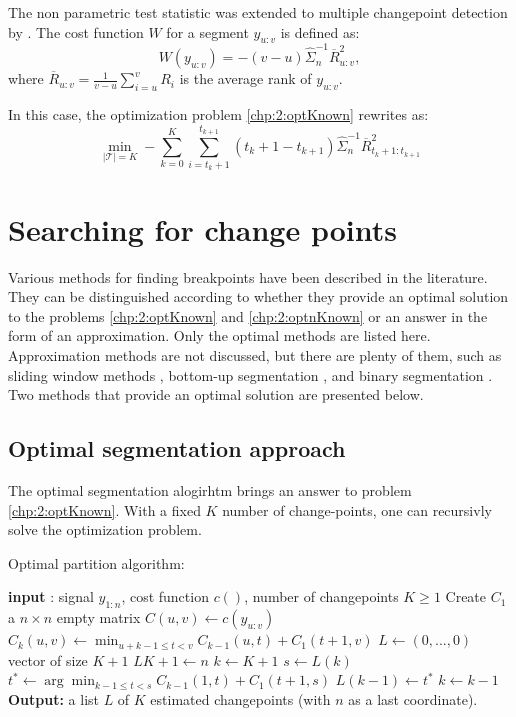 The non parametric test statistic was extended to multiple changepoint detection by \cite{lung2015}. The cost function $W$ for a segment $y_{u:v}$ is defined as: 
\begin{equation}
  W(y_{u:v}) = -(v-u)\hat{\Sigma}^{-1}_n\overline{R}^2_{u:v},
\end{equation}
where $\overline{R}_{u:v} = \frac{1}{v-u}\sum_{i = u}^vR_i$ is the average rank of $y_{u:v}$.

In this case, the optimization problem \ref{chp:2:optKnown} rewrites as: 
\begin{equation}\label{chp:2:npcost}
\min_{\lvert\mathcal{T}\rvert = K}  -\sum_{k=0}^K \sum_{i = t_k+1}^{t_{k+1}} (t_k+1-t_{k+1})\hat{\Sigma}^{-1}_n\overline{R}^2_{t_k+1:t_{k+1}}
\end{equation}       

\section{Searching for change points}

Various methods for finding breakpoints have been described in the literature. They can be distinguished according to whether they provide an optimal solution to the problems \ref{chp:2:optKnown} and \ref{chp:2:optnKnown} or an answer in the form of an approximation. Only the optimal methods are listed here. Approximation methods are not discussed, but there are plenty of them, such as sliding window methods \cite{Li2010,Liu2022}, bottom-up segmentation \cite{chen1998speaker}, and binary segmentation \cite{Yang2001,Fryzlewicz2014}. Two methods that provide an optimal solution are presented below.

\subsection{Optimal segmentation approach}

The optimal segmentation alogirhtm brings an answer to problem \ref{chp:2:optKnown}. With a fixed $K$ number of change-points, one can recursivly solve the optimization problem. 

\begin{algorithm}[ht]
\caption{Optimal partition algorithm:}\label{chp2:algo:opt}
\begin{algorithmic}

\State \textbf{input} : signal $y_{1:n}$, cost function $c()$, number of changepoints $K \geq 1$
\State Create $C_1$ a $n\times n$ empty matrix
  \State $C(u,v) \gets c(y_{u:v})$
\EndFor
{}
      \State $C_k(u,v) \gets \min_{u+k-1 \leq t < v} C_{k-1}(u,t) + C_1(t+1,v)$ 
    \EndFor
  \EndFor
\EndIf
\State $L \gets (0,...,0)$ vector of size $K+1$
\State $L{K+1} \gets n$
\State $k \gets K+1$
  \State $s \gets L(k)$
  \State $t^* \gets \arg\min_{k-1\leq t < s}C_{k-1}(1,t)+C_1(t+1,s)$
  \State $L(k-1) \gets t^*$
  \State $k \gets k-1$
\EndWhile
\State \textbf{Output:} a list $L$ of $K$ estimated changepoints (with $n$ as a last coordinate).
\end{algorithmic}
\end{algorithm} 

